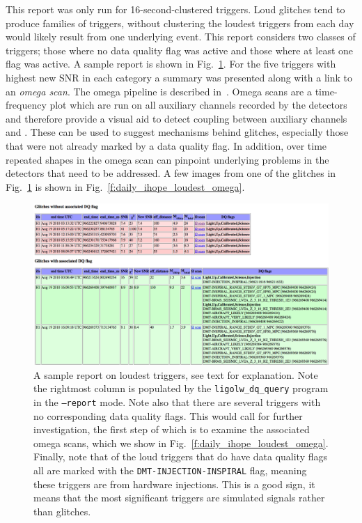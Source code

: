 This report was only run for 16-second-clustered triggers.  Loud
glitches tend to produce families of triggers, without clustering the
loudest triggers from each day would likely result from one underlying
event.  This report considers two classes of triggers; those where no
data quality flag was active and those where at least one flag was
active.  A sample report is shown in
Fig.~\ref{f:daily_ihope_loudest}.  For the five triggers with
highest new SNR in each category a summary was presented along with a
link to an \emph{omega scan}.  The omega pipeline is described
in~\cite{Chatterji:thesis}.  Omega scans are a time-frequency plot
which are run on all auxiliary channels recorded by the detectors
and therefore provide a visual aid to detect coupling between
auxiliary channels and \darmerr.  These can be used to suggest
mechanisms behind glitches, especially those that were not already
marked by a data quality flag.  In addition, over time repeated shapes in the
omega scan can pinpoint underlying problems in the detectors that
need to be addressed.  A few images from one of the glitches in
Fig.~\ref{f:daily_ihope_loudest} is shown in
Fig.~\ref{f:daily_ihope_loudest_omega}.

\begin{figure}
  \includegraphics[width=\linewidth]{figures/detchar/loudest.png}
  \caption[Sample loudest trigger report from Aug 19, 2010]{
  \label{f:daily_ihope_loudest}
A sample report on loudest triggers, see text for explanation.  Note the
rightmost column is populated by
the \texttt{ligolw\_dq\_query} program in the \texttt{--report} mode.
Note also that there are several triggers with no corresponding data
quality flags.  This would call for further investigation, the first
step of which is to examine the associated omega scans, which we show
in Fig.~\ref{f:daily_ihope_loudest_omega}.  Finally, note that of
the loud triggers that do have data quality flags all are marked with
the \texttt{DMT-INJECTION-INSPIRAL} flag, meaning these triggers are
from hardware injections.  This is a good sign, it means that the most
significant triggers are simulated signals rather than glitches.
}
\end{figure}%


